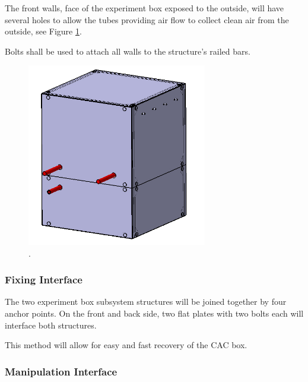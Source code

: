 The front walls, face of the experiment box exposed to the outside, will have several holes to allow the tubes providing air flow to collect clean air from the outside, see Figure \ref{front_wall_holes}.


Bolts shall be used to attach all walls to the structure's railed bars.


\begin{figure}[!ht]
    \centering
    \includegraphics[width=0.7\textwidth]{4-experiment-design/img/frontal_holes.jpg}
    \caption{.}
    \label{front_wall_holes}
\end{figure}

\pagebreak
\subsubsection{Fixing Interface}

The two experiment box subsystem structures will be joined together by four anchor points. On the front and back side, two flat plates with two bolts each will interface both structures. 

This method will allow for easy and fast recovery of the CAC box. 
 


\pagebreak
\subsubsection{Manipulation Interface}

